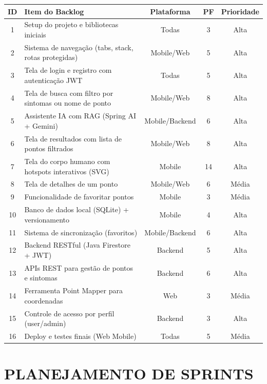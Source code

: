 \begin{quadro}[htb]
\caption{Product Backlog do Appunture}
\label{qua:backlog}
\centering
\footnotesize
\begin{tabular}{|c|p{5cm}|c|c|c|}
\hline
\textbf{ID} & \textbf{Item do Backlog} & \textbf{Plataforma} & \textbf{PF} & \textbf{Prioridade} \\
\hline
1 & Setup do projeto e bibliotecas iniciais & Todas & 3 & Alta \\
\hline
2 & Sistema de navegação (tabs, stack, rotas protegidas) & Mobile/Web & 5 & Alta \\
\hline
3 & Tela de login e registro com autenticação JWT & Todas & 5 & Alta \\
\hline
4 & Tela de busca com filtro por sintomas ou nome de ponto & Mobile/Web & 8 & Alta \\
\hline
5 & Assistente IA com RAG (Spring AI + Gemini) & Mobile/Backend & 6 & Alta \\
\hline
6 & Tela de resultados com lista de pontos filtrados & Mobile/Web & 8 & Alta \\
\hline
7 & Tela do corpo humano com hotspots interativos (SVG) & Mobile & 14 & Alta \\
\hline
8 & Tela de detalhes de um ponto & Mobile/Web & 6 & Média \\
\hline
9 & Funcionalidade de favoritar pontos & Mobile & 3 & Média \\
\hline
10 & Banco de dados local (SQLite) + versionamento & Mobile & 4 & Alta \\
\hline
11 & Sistema de sincronização (favoritos) & Mobile/Backend & 6 & Alta \\
\hline
12 & Backend RESTful (Java Firestore + JWT) & Backend & 5 & Alta \\
\hline
13 & APIs REST para gestão de pontos e sintomas & Backend & 6 & Alta \\
\hline
14 & Ferramenta Point Mapper para coordenadas & Web & 3 & Média \\
\hline
15 & Controle de acesso por perfil (user/admin) & Backend & 3 & Alta \\
\hline
16 & Deploy e testes finais (Web Mobile) & Todas & 5 & Média \\
\hline
\end{tabular}
\end{quadro}

\section{PLANEJAMENTO DE SPRINTS} \label{sec:sprints}

